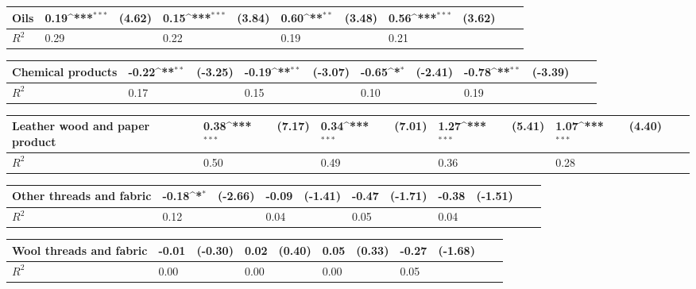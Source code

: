 \def\sym#1{\ifmmode^{#1}\else\(^{#1}\)\fi}
\begin{tabular}{p{4cm} p{1.4cm} p{1.2cm} p{1.5cm}  p{1.5cm} p{1.4cm} p{1.2cm} p{1.5cm} p{1.5cm}  p{1.5cm} p{1.5cm} }
\hline
Oils            &     0.19\sym{***}&   (4.62)&     0.15\sym{***}&   (3.84)&     0.60\sym{**} &   (3.48)&     0.56\sym{***}&   (3.62)\\
\hline
\(R^{2}\)       &     0.29         &         &     0.22         &         &     0.19         &         &     0.21         &         \\
\end{tabular}
\def\sym#1{\ifmmode^{#1}\else\(^{#1}\)\fi}
\begin{tabular}{p{4cm} p{1.4cm} p{1.2cm} p{1.5cm}  p{1.5cm} p{1.4cm} p{1.2cm} p{1.5cm} p{1.5cm}  p{1.5cm} p{1.5cm} }
\hline
Chemical products&    -0.22\sym{**} &  (-3.25)&    -0.19\sym{**} &  (-3.07)&    -0.65\sym{*}  &  (-2.41)&    -0.78\sym{**} &  (-3.39)\\
\hline
\(R^{2}\)       &     0.17         &         &     0.15         &         &     0.10         &         &     0.19         &         \\
\end{tabular}
\def\sym#1{\ifmmode^{#1}\else\(^{#1}\)\fi}
\begin{tabular}{p{4cm} p{1.4cm} p{1.2cm} p{1.5cm}  p{1.5cm} p{1.4cm} p{1.2cm} p{1.5cm} p{1.5cm}  p{1.5cm} p{1.5cm} }
\hline
Leather wood and paper product&     0.38\sym{***}&   (7.17)&     0.34\sym{***}&   (7.01)&     1.27\sym{***}&   (5.41)&     1.07\sym{***}&   (4.40)\\
\hline
\(R^{2}\)       &     0.50         &         &     0.49         &         &     0.36         &         &     0.28         &         \\
\end{tabular}
\def\sym#1{\ifmmode^{#1}\else\(^{#1}\)\fi}
\begin{tabular}{p{4cm} p{1.4cm} p{1.2cm} p{1.5cm}  p{1.5cm} p{1.4cm} p{1.2cm} p{1.5cm} p{1.5cm}  p{1.5cm} p{1.5cm} }
\hline
Other threads and fabric&    -0.18\sym{*}  &  (-2.66)&    -0.09         &  (-1.41)&    -0.47         &  (-1.71)&    -0.38         &  (-1.51)\\
\hline
\(R^{2}\)       &     0.12         &         &     0.04         &         &     0.05         &         &     0.04         &         \\
\end{tabular}
\def\sym#1{\ifmmode^{#1}\else\(^{#1}\)\fi}
\begin{tabular}{p{4cm} p{1.4cm} p{1.2cm} p{1.5cm}  p{1.5cm} p{1.4cm} p{1.2cm} p{1.5cm} p{1.5cm}  p{1.5cm} p{1.5cm} }
\hline
Wool threads and fabric&    -0.01         &  (-0.30)&     0.02         &   (0.40)&     0.05         &   (0.33)&    -0.27         &  (-1.68)\\
\hline
\(R^{2}\)       &     0.00         &         &     0.00         &         &     0.00         &         &     0.05         &         \\
\end{tabular}
